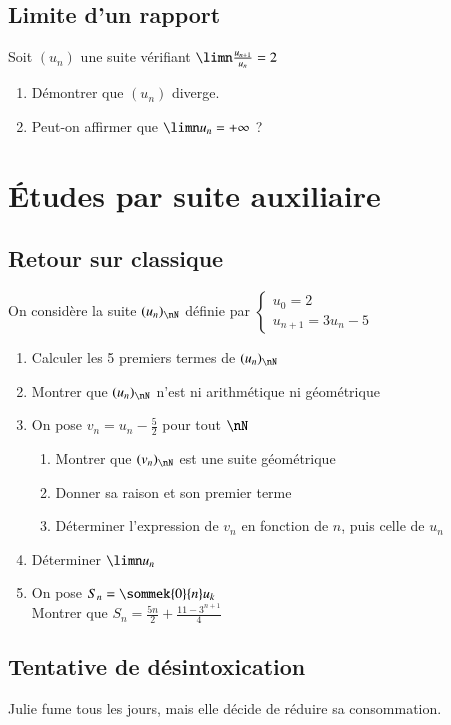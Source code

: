 \documentclass[oneside,12pt]{article}          %
\begin{document}
\subsection{Limite d'un rapport}
Soit $(u_n)$ une suite vérifiant $\limn\frac{u_{n+1}}{u_n}=2$
\begin{enumerate}
	\item Démontrer que $(u_n)$ diverge.
	\item Peut-on affirmer que $\limn u_n=+\infty$ ?
\end{enumerate}



\section{Études par suite auxiliaire}

\subsection{Retour sur classique}
On considère la suite $(u_n)_{\nN}$ définie par $\begin{cases}u_0=2\\u_{n+1}=3u_n-5\end{cases}$
\begin{enumerate}
    \item Calculer les 5 premiers termes de $(u_n)_{\nN}$
    \item Montrer que $(u_n)_{\nN}$ n'est ni arithmétique ni géométrique
    \item On pose $v_n=u_n-\frac{5}{2}$ pour tout $\nN$
    \begin{enumerate}
        \item Montrer que $(v_n)_{\nN}$ est une suite géométrique
        \item Donner sa raison et son premier terme
        \item Déterminer l'expression de $v_n$ en fonction de $n$, puis celle de $u_n$
    \end{enumerate}
    \item Déterminer $\limn u_n$
    \item On pose $S_n=\sommek{0}{n}u_k$\\
		Montrer que $S_n=\frac{5n}{2}+\frac{11-3^{n+1}}{4}$

\end{enumerate}



\subsection{Tentative de désintoxication}
Julie fume tous les jours, mais elle décide de réduire sa consommation.
\end{document}
